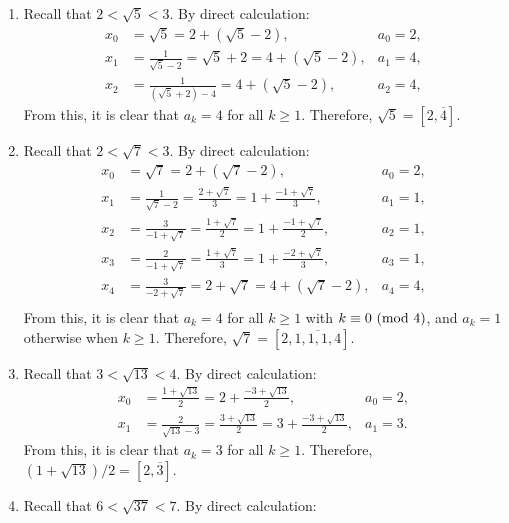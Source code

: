 \begin{solution}
    \begin{enumerate}
        \item Recall that $2 < \sqrt{5} < 3$. By direct calculation:
        \begin{align*}
            x_0 &= \sqrt{5} = 2 + (\sqrt{5} - 2), & a_0 = 2, \\
            x_1 &= \frac{1}{\sqrt{5} - 2} = \sqrt{5} + 2 = 4 + (\sqrt{5} - 2), & a_1 = 4, \\
            x_2 &= \frac{1}{(\sqrt{5} + 2) - 4} = 4 + (\sqrt{5} - 2), & a_2 = 4,
        \end{align*}
        From this, it is clear that $a_k = 4$ for all $k \geq 1$. Therefore, $\sqrt{5} = [2, \overline{4}]$.
        \item Recall that $2 < \sqrt{7} < 3$. By direct calculation:
        \begin{align*}
            x_0 &= \sqrt{7} = 2 + (\sqrt{7} - 2), & a_0 = 2, \\
            x_1 &= \frac{1}{\sqrt{7} - 2} = \frac{2 + \sqrt{7}}{3} = 1 + \frac{-1 + \sqrt{7}}{3}, & a_1 = 1, \\
            x_2 &= \frac{3}{-1 + \sqrt{7}} = \frac{1 + \sqrt{7}}{2} = 1 + \frac{-1 + \sqrt{7}}{2}, & a_2 = 1, \\
            x_3 &= \frac{2}{-1 + \sqrt{7}} = \frac{1 + \sqrt{7}}{3} = 1 + \frac{-2 + \sqrt{7}}{3}, & a_3= 1, \\
            x_4 &= \frac{3}{-2 + \sqrt{7}} = 2+ \sqrt{7} = 4 + (\sqrt{7} - 2), & a_4= 4, \\
        \end{align*}
        From this, it is clear that $a_k = 4$ for all $k \geq 1$ with $k \equiv 0 \ (\mathrm{mod}\ 4)$, and $a_k = 1$ otherwise when $k \geq 1$. Therefore, $\sqrt{7} = [2, \overline{1, 1, 1, 4}]$.
        \item Recall that $3 < \sqrt{13} < 4$. By direct calculation:
        \begin{align*}
            x_0 &= \frac{1 + \sqrt{13}}{2} = 2 + \frac{-3 + \sqrt{13}}{2}, & a_0 = 2, \\
            x_1 &= \frac{2}{\sqrt{13} - 3} = \frac{3 + \sqrt{13}}{2} = 3 + \frac{-3 + \sqrt{13}}{2}, & a_1 = 3.
        \end{align*}
        From this, it is clear that $a_k = 3$ for all $k \geq 1$. Therefore, $(1 + \sqrt{13})/2 = [2, \overline{3}]$.
        \item Recall that $6 < \sqrt{37} < 7$. By direct calculation:
        \begin{align*}

\end{align*}
\end{enumerate}
\end{solution}

